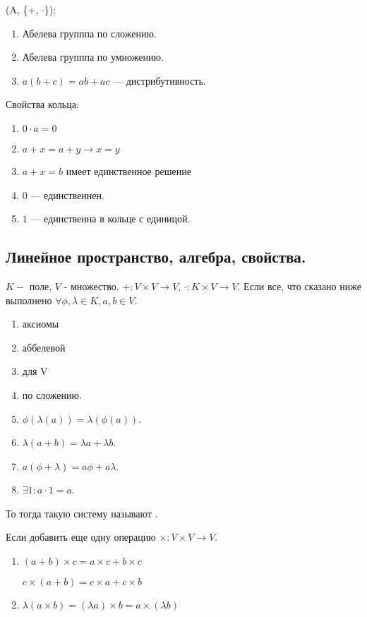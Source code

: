   (A, \{+, $\cdot$\}):
\begin{enumerate}
 \item Абелева групппа по сложению.
 \item Абелева групппа по умножению.
 \item $a(b+c) = ab+ac$ --- дистрибутивность. 
\end{enumerate}

Свойства кольца:

\begin{enumerate}
    \item $0 \cdot a = 0$
    \item $a+x = a+ y \rightarrow x=y$
    \item $a + x = b$ имеет единственное решение
    \item $0$ --- единственнен.
    \item $1$ --- единственна в кольце с единицой.
\end{enumerate}

\subsection{Линейное пространство, алгебра, свойства.}

$K - $ поле, $V$ - множество. $+: V \times V \rightarrow V$, $\cdot: K\times V \rightarrow V$. Если все, что сказано ниже выполнено  $\forall \phi, \lambda \in K, a,b \in V$.

\begin{enumerate}
    \item аксиомы
    \item аббелевой 
    \item для V
    \item по сложению.
    \item $ \phi(\lambda(a)) = \lambda(\phi(a))$.
    \item $\lambda (a+b) = \lambda a + \lambda b$.
    \item $a ( \phi + \lambda) = a\phi + a \lambda $.
    \item $\exists 1: a \cdot 1 =a$.
\end{enumerate}

То тогда такую систему называют .

Если добавить еще одну операцию $\times: V \times V \rightarrow V$.

\begin{enumerate}
    \item $(a+b)\times c = a \times c + b \times c $

    $c\times (a+b) = c \times a + c \times b$

    \item $\lambda (a \times b) = (\lambda a )\times b = a \times (\lambda b)$
\end{enumerate}

